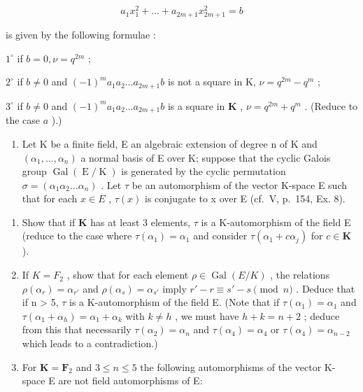 \[
a _ {1} x _ {1} ^ {2} + \dots + a _ {2 m + 1} x _ {2 m + 1} ^ {2} = b
\]

is given by the following formulae :

\(1^{\circ}\) if \(b = 0, \nu = q^{2m}\) ;

\(2^{\circ}\) if \(b \neq 0\) and \((-1)^{m}a_{1}a_{2} \ldots a_{2m+1}b\) is not a square in K, \(\nu = q^{2m} - q^{m}\) ;

\(3^{\circ}\) if \(b \neq 0\) and \((-1)^{m}a_{1}a_{2} \ldots a_{2m+1}b\) is a square in \(\mathbf{K}\) , \(\nu = q^{2m} + q^{m}\) . (Reduce to the case \(a\) ).)

\begin{enumerate}
\def\labelenumi{\arabic{enumi})}
\setcounter{enumi}{6}
\tightlist
\item
  Let K be a finite field, E an algebraic extension of degree n of K and \((\alpha_{1}, \ldots, \alpha_{n})\) a normal basis of E over K; suppose that the cyclic Galois group \(\operatorname{Gal}(\operatorname{E}/\operatorname{K})\) is generated by the cyclic permutation \(\sigma = (\alpha_{1}\alpha_{2} \ldots \alpha_{n})\) . Let \(\tau\) be an automorphism of the vector K-space E such that for each \(x \in E\) , \(\tau(x)\) is conjugate to x over E (cf.~V, p.~154, Ex. 8).
\end{enumerate}

\begin{enumerate}
\def\labelenumi{\alph{enumi})}
\item
  Show that if \(\mathbf{K}\) has at least 3 elements, \(\tau\) is a K-automorphism of the field E (reduce to the case where \(\tau(\alpha_1) = \alpha_1\) and consider \(\tau(\alpha_1 + c\alpha_j)\) for \(c \in \mathbf{K}\) ).
\item
  If \(K = F_{2}\) , show that for each element \(\rho \in \operatorname{Gal}(E/K)\) , the relations \(\rho(\alpha_{r}) = \alpha_{r'}\) and \(\rho(\alpha_{s}) = \alpha_{s'}\) imply \(r' - r \equiv s' - s \pmod{n}\) . Deduce that if n \textgreater{} 5, \(\tau\) is a K-automorphism of the field E. (Note that if \(\tau(\alpha_{1}) = \alpha_{1}\) and \(\tau(\alpha_{1} + \alpha_{h}) = \alpha_{1} + \alpha_{k}\) with \(k \neq h\) , we must have \(h + k = n + 2\) ; deduce from this that necessarily \(\tau(\alpha_{2}) = \alpha_{n}\) and \(\tau(\alpha_{4}) = \alpha_{4}\) or \(\tau(\alpha_{4}) = \alpha_{n-2}\) which leads to a contradiction.)
\item
  For \(\mathbf{K} = \mathbf{F}_2\) and \(3 \leqslant n \leqslant 5\) the following automorphisms of the vector K-space E are not field automorphisms of E:
\end{enumerate}

